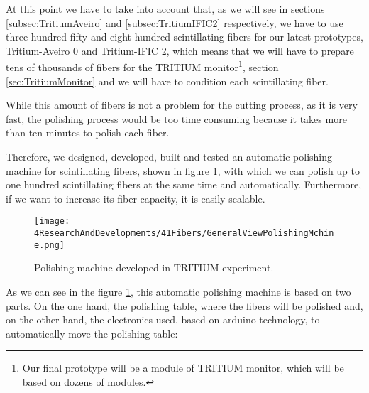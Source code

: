 At this point we have to take into account that, as we will see in sections \ref{subsec:TritiumAveiro} and \ref{subsec:TritiumIFIC2} respectively, we have to use three hundred fifty and eight hundred scintillating fibers for our latest prototypes, Tritium-Aveiro 0 and Tritium-IFIC 2, which means that we will have to prepare tens of thousands of fibers for the TRITIUM monitor\footnote{Our final prototype will be a module of TRITIUM monitor, which will be based on dozens of modules.}, section \ref{sec:TritiumMonitor} and we will have to condition each scintillating fiber.

While this amount of fibers is not a problem for the cutting process, as it is very fast, the polishing process would be too time consuming because it takes more than ten minutes to polish each fiber. 

Therefore, we designed, developed, built and tested an automatic polishing machine for scintillating fibers, shown in figure \ref{fig:GeneralViewPolishingMachine}, with which we can polish up to one hundred scintillating fibers at the same time and automatically. Furthermore, if we want to increase its fiber capacity, it is easily scalable.


\begin{figure}[h]
\centering
\texttt{[image: 4ResearchAndDevelopments/41Fibers/GeneralViewPolishingMchine.png]}
\caption{Polishing machine developed in TRITIUM experiment.\label{fig:GeneralViewPolishingMachine}}
\end{figure}

As we can see in the figure \ref{fig:GeneralViewPolishingMachine}, this automatic polishing machine is based on two parts. On the one hand, the polishing table, where the fibers will be polished and, on the other hand, the electronics used, based on arduino technology, to automatically move the polishing table:

